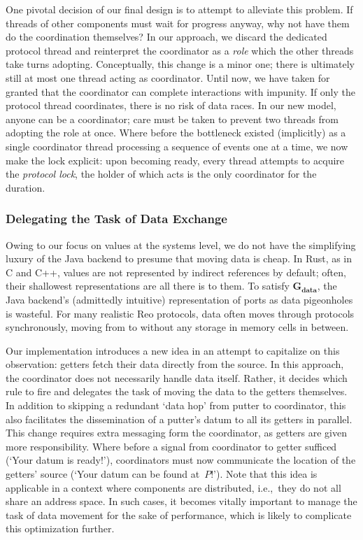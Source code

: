 One pivotal decision of our final design is to attempt to alleviate this problem. If threads of other components must wait for progress anyway, why not have them do the coordination themselves? In our approach, we discard the dedicated protocol thread and reinterpret the coordinator as a \textit{role} which the other threads take turns adopting. Conceptually, this change is a minor one; there is ultimately still at most one thread acting as coordinator. Until now, we have taken for granted that the coordinator can complete interactions with impunity. If only the protocol thread coordinates, there is no risk of data races. In our new model, anyone can be a coordinator; care must be taken to prevent two threads from adopting the role at once. Where before the bottleneck existed (implicitly) as a single coordinator thread processing a sequence of events one at a time, we now make the lock explicit: upon becoming ready, every thread attempts to acquire the \textit{protocol lock}, the holder of which acts is the only coordinator for the duration.

\subsubsection{Delegating the Task of Data Exchange}
Owing to our focus on values at the systems level, we do not have the simplifying luxury of the Java backend to presume that moving data is cheap. In Rust, as in C and C++, values are not represented by indirect references by default; often, their shallowest representations are all there is to them. To satisfy $\boldsymbol{G_{data}}$, the Java backend's (admittedly intuitive) representation of ports as data pigeonholes is wasteful. For many realistic Reo protocols, data often moves through protocols synchronously, moving from  to  without any storage in memory cells in between. 

Our implementation introduces a new idea in an attempt to capitalize on this observation: getters fetch their data directly from the source. In this approach, the coordinator does not necessarily handle data itself. Rather, it decides which rule to fire and delegates the task of moving the data to the getters themselves. In addition to skipping a redundant `data hop' from putter to coordinator, this also facilitates the dissemination of a putter's datum to all its getters in parallel. This change requires extra messaging form the coordinator, as getters are given more responsibility. Where before a signal from coordinator to getter sufficed (`Your datum is ready!'), coordinators must now communicate the location of the getters' source (`Your datum can be found at~$P$!'). Note that this idea is applicable in a context where components are distributed, i.e.,\ they do not all share an address space. In such cases, it becomes vitally important to manage the task of data movement for the sake of performance, which is likely to complicate this optimization further. 


